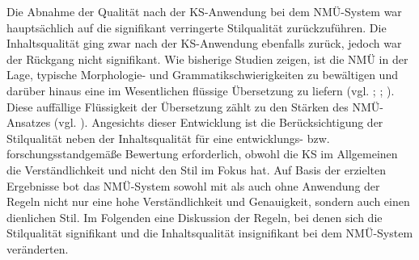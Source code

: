 Die Abnahme der Qualität nach der KS-Anwendung bei dem NMÜ-System war hauptsächlich auf die signifikant verringerte Stilqualität zurückzuführen. Die Inhaltsqualität ging zwar nach der KS-Anwendung ebenfalls zurück, jedoch war der Rückgang nicht signifikant. Wie bisherige Studien zeigen, ist die NMÜ in der Lage, typische Morphologie- und Grammatikschwierigkeiten zu bewältigen und darüber hinaus eine im Wesentlichen flüssige Übersetzung zu liefern (vgl. \citealt{BentivogliEtAl2016}; \citealt{ToralSanchez-Cartagena2017}; \citealt{VanBrusselEtAl2018}). Diese auffällige Flüssigkeit der Übersetzung zählt zu den Stärken des NMÜ-Ansatzes (vgl. \citealt{ToralSanchez-Cartagena2017}). Angesichts dieser Entwicklung ist die Berücksichtigung der Stilqualität neben der Inhaltsqualität für eine entwicklungs- bzw. forschungsstandgemäße Bewertung erforderlich, obwohl die KS im Allgemeinen die Verständlichkeit und nicht den Stil im Fokus hat. Auf Basis der erzielten Ergebnisse bot das NMÜ-System sowohl mit als auch ohne Anwendung der Regeln nicht nur eine hohe Verständlichkeit und Genauigkeit, sondern auch einen dienlichen Stil. Im Folgenden eine Diskussion der Regeln, bei denen sich die Stilqualität signifikant und die Inhaltsqualität insignifikant bei dem NMÜ-System veränderten.

